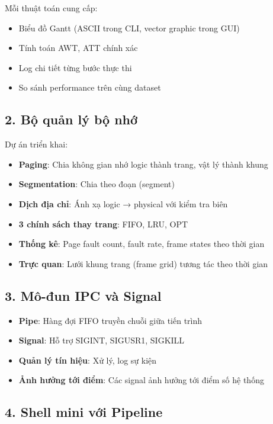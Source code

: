Mỗi thuật toán cung cấp:
\begin{itemize}[leftmargin=1.5cm]
  \item Biểu đồ Gantt (ASCII trong CLI, vector graphic trong GUI)
  \item Tính toán AWT, ATT chính xác
  \item Log chi tiết từng bước thực thi
  \item So sánh performance trên cùng dataset
\end{itemize}

\subsection*{2. Bộ quản lý bộ nhớ}

Dự án triển khai:

\begin{itemize}[leftmargin=1.5cm]
  \item \textbf{Paging}: Chia không gian nhớ logic thành trang, vật lý thành khung
  \item \textbf{Segmentation}: Chia theo đoạn (segment)
  \item \textbf{Dịch địa chỉ}: Ánh xạ logic → physical với kiểm tra biên
  \item \textbf{3 chính sách thay trang}: FIFO, LRU, OPT
  \item \textbf{Thống kê}: Page fault count, fault rate, frame states theo thời gian
  \item \textbf{Trực quan}: Lưới khung trang (frame grid) tương tác theo thời gian
\end{itemize}

\subsection*{3. Mô-đun IPC và Signal}

\begin{itemize}[leftmargin=1.5cm]
  \item \textbf{Pipe}: Hàng đợi FIFO truyền chuỗi giữa tiến trình
  \item \textbf{Signal}: Hỗ trợ SIGINT, SIGUSR1, SIGKILL
  \item \textbf{Quản lý tín hiệu}: Xử lý, log sự kiện
  \item \textbf{Ảnh hưởng tới điểm}: Các signal ảnh hưởng tới điểm số hệ thống
\end{itemize}

\subsection*{4. Shell mini với Pipeline}

